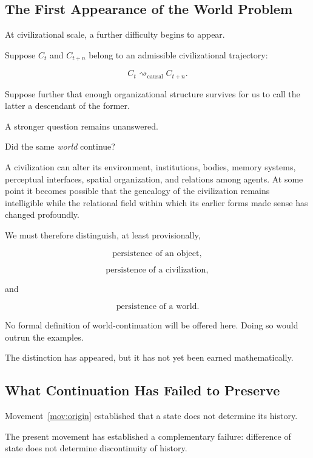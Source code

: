 \documentclass[
  11pt,
  a4paper,
  DIV=12,
  BCOR=0mm,
  parskip=half-
]{scrartcl}
\newcommand{\leadcausal}{%
  \mathrel{\rightsquigarrow_{\mathrm{causal}}}%
}
\theoremstyle{definition}
\theoremstyle{plain}
\theoremstyle{remark}
\begin{document}
\subsection{The First Appearance of the World Problem}
\label{sec:first-world-problem}

At civilizational scale, a further difficulty begins to appear.

Suppose \(C_t\) and \(C_{t+n}\) belong to an admissible civilizational
trajectory:

\[
  C_t
  \leadcausal
  C_{t+n}.
\]

Suppose further that enough organizational structure survives for us to call
the latter a descendant of the former.

A stronger question remains unanswered.

Did the same \emph{world} continue?

A civilization can alter its environment, institutions, bodies, memory
systems, perceptual interfaces, spatial organization, and relations among
agents. At some point it becomes possible that the genealogy of the
civilization remains intelligible while the relational field within which its
earlier forms made sense has changed profoundly.

We must therefore distinguish, at least provisionally,

\[
  \text{persistence of an object},
\]

\[
  \text{persistence of a civilization},
\]

and

\[
  \text{persistence of a world}.
\]

No formal definition of world-continuation will be offered here. Doing so
would outrun the examples.

The distinction has appeared, but it has not yet been earned mathematically.


\subsection{What Continuation Has Failed to Preserve}
\label{sec:continuation-forced}

Movement~\ref{mov:origin} established that a state does not determine its
history.

The present movement has established a complementary failure: difference of
state does not determine discontinuity of history.
\end{document}
